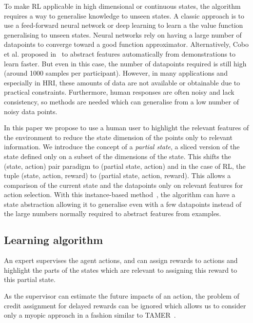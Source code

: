 \documentclass[letterpaper]{article} %
\begin{document}
To make RL applicable in high dimensional or continuous states, the algorithm
requires a way to generalise knowledge to unseen states. A classic approach is
to use a feed-forward neural network or deep learning to learn a the value
function generalising to unseen states. Neural networks rely on having a large
number of datapoints to converge toward a good function approximator.
Alternatively, Cobo et al. proposed in~\cite{cobo2011automatic} to abstract
features automatically from demonstrations to learn faster. But even in this case,
the number of datapoints required is still high (around 1000 samples per
participant). However, in many applications and especially in HRI, these
amounts of data are not available or obtainable due to practical constraints.
Furthermore, human responses are often noisy and lack consistency, so methods
are needed which can generalise from a low number of noisy data points.

In this paper we propose to use a human user to highlight the relevant features
of the environment to reduce the state dimension of the points only to relevant
information. We introduce the concept of a \textit{partial state}, a sliced version of
the state defined only on a subset of the dimensions of the state. This shifts
the (state, action) pair paradigm to (partial state, action)  and in the case of
RL, the tuple (state, action, reward) to (partial state, action, reward). This
allows a comparison of the current state and the datapoints only on relevant features
for action selection. With this instance-based method~\cite{aha1991instance},
the algorithm can have a state abstraction allowing it to generalise even with a
few datapoints instead of the large numbers normally required to abstract
features from examples.

\subsection{Learning algorithm}

An expert supervises the agent actions, and can assign rewards to actions and
highlight the parts of the states which are relevant to assigning this reward to
this partial state.

As the supervisor can estimate the future impacts of an action, the problem of
credit assignment for delayed rewards can be ignored which allows us to consider
only a myopic approach in a fashion similar to TAMER~\cite{knox2009interactively}. 
\end{document}

